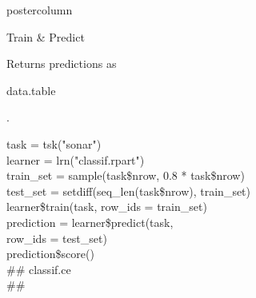 \documentclass{beamer}
\newcommand{\codeinline}[1]{\begin{codeboxinline}#1\end{codeboxinline}}
\begin{document}
\begin{frame}[fragile]{}
\begin{columns}
\begin{column}{.245\textwidth}
\begin{beamercolorbox}[center]{postercolumn}
\begin{minipage}{.98\textwidth}
{\begin{myblock}{Train \& Predict}
\begin{codebox}
						\end{codebox}
						Returns predictions as \codeinline{data.table}.
						\\
						\begin{codeboxexample}
						{\footnotesize
							task = tsk("sonar")\\
							learner = lrn("classif.rpart")
							\vspace{1em}
							\\
							train\_set = sample(task\$nrow, 0.8 * task\$nrow)\\
							test\_set = setdiff(seq\_len(task\$nrow), train\_set)
							\vspace{1em}
							\\
							learner\$train(task, row\_ids = train\_set)
							\vspace{1em}
							\\
							prediction = learner\$predict(task,\\
							\hspace*{1ex} row\_ids = test\_set)\\
							prediction\$score()\\
							\#\# classif.ce\\
							\#\# }
					\end{codeboxexample}
					\end{myblock}
					\vfill
					}
				\end{minipage}
			\end{beamercolorbox}
		\end{column}
	\end{columns}
\end{frame}
\end{document}
